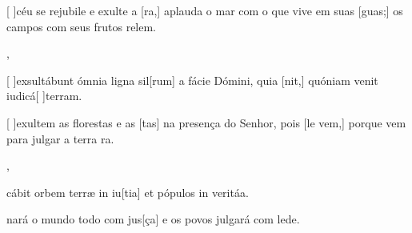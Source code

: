 {    {\item {}[ ]{céu} se rejubile e exulte a [ra,] aplauda o mar com o que vive em suas [guas;] os campos com seus frutos relem.~\Antiphona},
  {\item {}[ ]{ex}sultábunt ómnia ligna sil[rum] a fácie Dómini, quia [nit,] quóniam venit iudicá[ ]{ter}ram.~\Antiphona}%
    {\item {}[ ]{e}xultem as florestas e as [tas] na presença do Senhor, pois [le vem,] porque vem para julgar a terra ra.~\Antiphona},
  {\item {}cábit orbem terræ in iu[tia] et pópulos in veritáa.~\Antiphona}%
    {\item {}nará o mundo todo com jus[ça] e os povos julgará com lede.~\Antiphona}
}